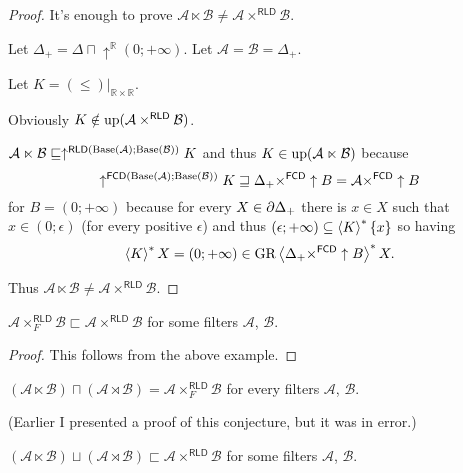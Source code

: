 \begin{proof}
It's enough to prove $\mathcal{A}\ltimes\mathcal{B}\neq\mathcal{A}\times^{\mathsf{RLD}}\mathcal{B}$.

Let $\Delta_{+}=\Delta\sqcap\uparrow^{\mathbb{R}}(0;+\infty)$. Let
$\mathcal{A}=\mathcal{B}=\Delta_{+}$.

Let $K=(\le)|_{\mathbb{R}\times\mathbb{R}}$.

Obviously $K\notin\operatorname{up}(\mathcal{A}\times^{\mathsf{RLD}}\mathcal{B})$.

$\mathcal{A}\ltimes\mathcal{B}\sqsubseteq\uparrow^{\mathsf{RLD}(\operatorname{Base}(\mathcal{A});\operatorname{Base}(\mathcal{B}))}K$
and thus $K\in\operatorname{up}(\mathcal{A}\ltimes\mathcal{B})$ because 
\[
\uparrow^{\mathsf{FCD}(\operatorname{Base}(\mathcal{A});\operatorname{Base}(\mathcal{B}))}K\sqsupseteq\Delta_{+}\times^{\mathsf{FCD}}\uparrow B=\mathcal{A}\times^{\mathsf{FCD}}\uparrow B
\]
for $B=(0;+\infty)$
because for every $X\in\partial\Delta_{+}$ there is $x\in X$ such that $x\in(0;\epsilon)$ (for every positive $\epsilon$)
and thus $(\epsilon;+\infty)\subseteq\left\langle K\right\rangle ^{\ast}\{x\}$ so having
\[\left\langle K\right\rangle ^{\ast}X = (0;+\infty) \in \operatorname{GR}\left\langle \Delta_{+}\times^{\mathsf{FCD}}\uparrow B\right\rangle ^{\ast}X.\]

Thus $\mathcal{A}\ltimes\mathcal{B}\neq\mathcal{A}\times^{\mathsf{RLD}}\mathcal{B}$.\end{proof}
\begin{example}
\label{secprod-neq}$\mathcal{A}\times_{F}^{\mathsf{RLD}}\mathcal{B}\sqsubset\mathcal{A}\times^{\mathsf{RLD}}\mathcal{B}$
for some filters $\mathcal{A}$, $\mathcal{B}$.\end{example}
\begin{proof}
This follows from the above example.\end{proof}
\begin{conjecture}
$(\mathcal{A}\ltimes\mathcal{B})\sqcap(\mathcal{A}\rtimes\mathcal{B})=\mathcal{A}\times_{F}^{\mathsf{RLD}}\mathcal{B}$
for every filters $\mathcal{A}$, $\mathcal{B}$.\end{conjecture}
(Earlier I presented a proof of this conjecture, but it was in error.)
\begin{example}
$(\mathcal{A}\ltimes\mathcal{B})\sqcup(\mathcal{A}\rtimes\mathcal{B})\sqsubset\mathcal{A}\times^{\mathsf{RLD}}\mathcal{B}$
for some filters $\mathcal{A}$, $\mathcal{B}$.\end{example}

